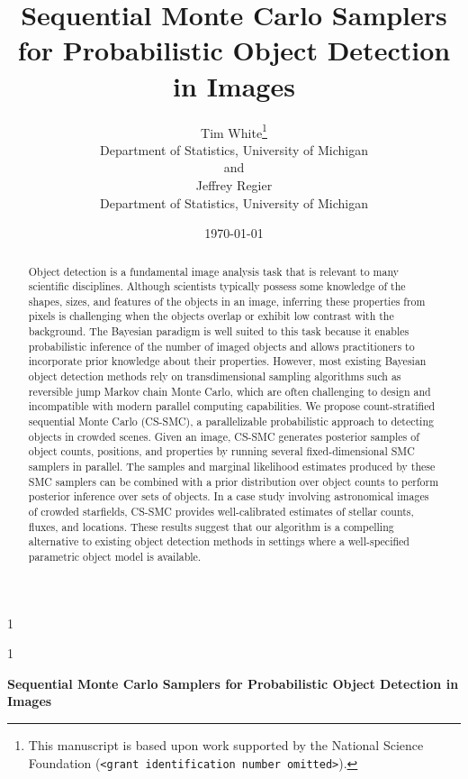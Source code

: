 \documentclass[
  12pt]{article}
\newcommand{\anon}{1}
\begin{document}
\def\spacingset#1{\renewcommand{\baselinestretch}{#1}\small\normalsize}
\spacingset{1}

\anon
{
  \title{\bf Sequential Monte Carlo Samplers for Probabilistic Object Detection in Images}
  \author{Tim White\thanks{
    This manuscript is based upon work supported by the National Science Foundation (\texttt{<grant identification number omitted>}).}\hspace{.2cm}\\
    Department of Statistics, University of Michigan\\
    and\\
    Jeffrey Regier\\
    Department of Statistics, University of Michigan}
  \date{\today}
  \maketitle
} \fi

\anon
{
  \bigskip
  \bigskip
  \bigskip
  \begin{center}
    {\LARGE\bf Sequential Monte Carlo Samplers for Probabilistic Object Detection in Images}
  \end{center}
  \medskip
} \fi

\bigskip
\begin{abstract}
Object detection is a fundamental image analysis task that is relevant to many scientific disciplines. Although scientists typically possess some knowledge of the shapes, sizes, and features of the objects in an image, inferring these properties from pixels is challenging when the objects overlap or exhibit low contrast with the background. The Bayesian paradigm is well suited to this task because it enables probabilistic inference of the number of imaged objects and allows practitioners to incorporate prior knowledge about their properties. However, most existing Bayesian object detection methods rely on transdimensional sampling algorithms such as reversible jump Markov chain Monte Carlo, which are often challenging to design and incompatible with modern parallel computing capabilities. We propose count-stratified sequential Monte Carlo (CS-SMC), a parallelizable probabilistic approach to detecting objects in crowded scenes. Given an image, CS-SMC generates posterior samples of object counts, positions, and properties by running several fixed-dimensional SMC samplers in parallel. The samples and marginal likelihood estimates produced by these SMC samplers can be combined with a prior distribution over object counts to perform posterior inference over sets of objects. In a case study involving astronomical images of crowded starfields, CS-SMC provides well-calibrated estimates of stellar counts, fluxes, and locations. These results suggest that our algorithm is a compelling alternative to existing object detection methods in settings where a well-specified parametric object model is available.
\end{abstract}
\end{document}
